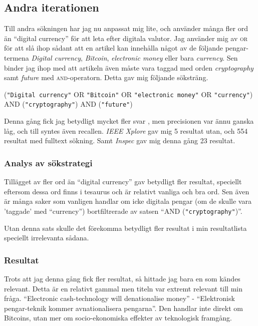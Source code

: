 \documentclass[a4paper,11pt,exjobb]{kth-mag}
\begin{document}
\subsection{Andra iterationen}
\label{sec:second}
Till andra sökningen har jag nu anpassat mig lite, och använder många fler ord än ``digital currency'' för att leta efter digitala valutor. Jag använder mig av \textsc{or} för att slå ihop sådant att en artikel kan innehålla något av de följande pengar-termena \textit{Digital currency}, \textit{Bitcoin}, \textit{electronic money} eller bara \textit{currency}. Sen binder jag ihop med att artikeln även måste vara taggad med orden \textit{cryptography} samt \textit{future} med \textsc{and}-operatorn.
 Detta gav mig följande söksträng.
\begin{center}
(\verb#"Digital currency"# \textsc{OR} \verb#"Bitcoin"# \textsc{OR} \verb#"electronic money"# \textsc{OR} \verb#"currency"#) \textsc{AND} (\verb#"cryptography"#) \textsc{AND} (\verb#"future"#)
\end{center}

Denna gång fick jag betydligt mycket fler svar , men precisionen var ännu ganska låg, och till syntes även recallen. \textit{IEEE Xplore} gav mig 5 resultat utan, och 554 resultat med fulltext sökning. Samt \textit{Inspec} gav mig denna gång 23 resultat.

\subsubsection{Analys av sökstrategi}
Tillägget av fler ord än ``digital currency'' gav betydligt fler resultat, speciellt eftersom dessa ord finns i tesaurus och är relativt vanliga och bra ord. Sen även är många saker som vanligen handlar om icke digitala pengar (om de skulle vara 'taggade' med ``currency'') bortfiltrerade av satsen ``\textsc{AND} (\verb#"cryptography"#)''.

Utan denna sats skulle det förekomma betydligt fler resultat i min resultatlista speciellt irrelevanta sådana.

\subsubsection{Resultat}
Trots att jag denna gång fick fler resultat, så hittade jag bara en\cite{second} som kändes relevant. Detta är en relativt gammal men titeln var extremt relevant till min fråga. ``Electronic cash-technology will denationalise money'' - ``Elektronisk pengar-teknik kommer avnationalisera pengarna''. Den handlar inte direkt om Bitcoins, utan mer om socio-ekonomiska effekter av teknologisk framgång.
\end{document}
